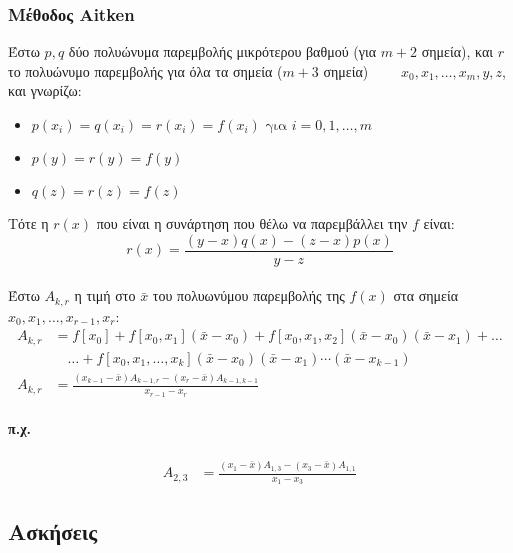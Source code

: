 \documentclass[11pt,a4paper,notitlepage,fleqn,draft]{article}
\begin{document}
 	\subsubsection{Μέθοδος Aitken}
 	Έστω \( p,q \) δύο πολυώνυμα παρεμβολής μικρότερου
 	βαθμού (για \( m+2 \) σημεία),
 	και \( r \) το πολυώνυμο παρεμβολής για όλα
 	τα σημεία (\( m+3 \) σημεία) \( \qquad x_0,x_1,\dots,
 	x_m,y,z \), και γνωρίζω:
 	\begin{itemize}
 		\item \( p(x_i)=q(x_i)=r(x_i)=f(x_i)
 		\text{ για } i=0,1,\dots,m \)
 		\item \( p(y) = r(y) = f(y) \)
 		\item \( q(z) = r(z) = f(z) \)
 	\end{itemize}
 	
 	Τότε η \( r(x) \) που είναι η συνάρτηση που θέλω να
 	παρεμβάλλει την \( f \) είναι:
 	\[
 	\boxed{
 	r(x) = \frac{(y-x)q(x) - (z-x)p(x)}{y-z}
    }
 	\]
 	
 	\paragraph{}
 	Έστω \( A_{k,r} \) η τιμή στο \( \bar x \) του πολυωνύμου
 	παρεμβολής της \( f(x) \) στα σημεία \( x_0,x_1,
 	\dots,x_{r-1},x_r \):
 	\begin{align*}
 	A_{k,r} &= f[x_0] + f[x_0,x_1](\bar x-x_0)
 	+ f[x_0,x_1,x_2](\bar x-x_0)(\bar x-x_1) + \dots
 	\\ &\quad \dots + f[x_0,x_1,\dots,x_k](\bar x-x_0)
 	(\bar x-x_1)\cdots(\bar x-x_{k-1}) \\
 	A_{k,r} &= \frac{(x_{k-1}-\bar x)A_{k-1,r}
 		-(x_r-\bar x)A_{k-1,k-1}}{x_{r-1}-x_r}
	\end{align*}
	\paragraph{π.χ.}
	\begin{align*}
		A_{2,3} &=
		\frac{(x_1-\bar x)A_{1,3}-(x_3-\bar x)A_{1,1}}{x_1-x_3}
	\end{align*}
	
	\subsection{Ασκήσεις}
\end{document}
